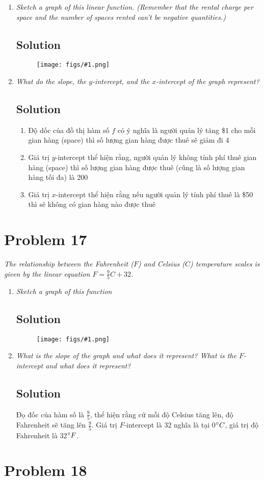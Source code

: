 \documentclass[11pt]{article}
\newcommand{\soln}{\subsection*}
\newcommand{\qn}{\textit}
\newcommand{\imgsoln}[1]{
	\begin{figure}[H]
		\centering
		\texttt{[image: figs/\#1.png]}
	\end{figure}
}
\begin{document}
\begin{enumerate}
	\item \qn{Sketch a graph of this linear function. (Remember that the rental charge per space and the number of spaces rented can't be negative quantities.)}
	\soln{Solution}
	\imgsoln{1.2.16-ans.a}
	
	\item \qn{What do the slope, the $y$-intercept, and the $x$-intercept of the graph represent?}
	\soln{Solution}
	\begin{enumerate}
		\item Độ dốc của đồ thị hàm số $f$ có ý nghĩa là người quản lý tăng \$1 cho mỗi gian hàng (space) thì số lượng gian hàng được thuê sẽ giảm đi 4
		
		\item Giá trị $y$-intercept thể hiện rằng, người quản lý không tính phí thuê gian hàng (space) thì số lượng gian hàng được thuê (cũng là số lượng gian hàng tối đa) là 200
		
		\item Giá trị $x$-intercept thể hiện rằng nếu người quản lý tính phí thuê là \$50 thì sẽ không có gian hàng nào được thuê
	\end{enumerate}
\end{enumerate}

\section*{Problem 17}

\qn{The relationship between the Fahrenheit ($F$) and Celsius ($C$) temperature scales is given by the linear equation $F=\frac{9}{5}C+32$.}

\begin{enumerate}
	\item \qn{Sketch a graph of this function}
	\soln{Solution}
	\imgsoln{1.2.17-ans.a}
	
	\item \qn{What is the slope of the graph and what does it represent? What is the $F$-intercept and what does it represent?}
	\soln{Solution}
	Đọ đốc của hàm số là $\frac{9}{5}$, thể hiện rằng cứ mỗi độ Celsius tăng lên, độ Fahrenheit sẽ tăng lên $\frac{9}{5}$. Giá trị $F$-intercept là 32 nghĩa là tại 0$\degree C$, giá trị độ Fahrenheit là 32$\degree F$.
\end{enumerate}

\section*{Problem 18}
\end{document}
